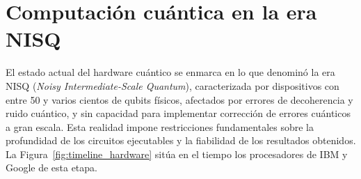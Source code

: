 \section{Computación cuántica en la era NISQ}

El estado actual del hardware cuántico se enmarca en lo que \cite{preskill2018} denominó la era NISQ (\textit{Noisy Intermediate-Scale Quantum}), caracterizada por dispositivos con entre 50 y varios cientos de qubits físicos, afectados por errores de decoherencia y ruido cuántico, y sin capacidad para implementar corrección de errores cuánticos a gran escala. Esta realidad impone restricciones fundamentales sobre la profundidad de los circuitos ejecutables y la fiabilidad de los resultados obtenidos. La Figura~\ref{fig:timeline_hardware} sitúa en el tiempo los procesadores de IBM y Google de esta etapa.

